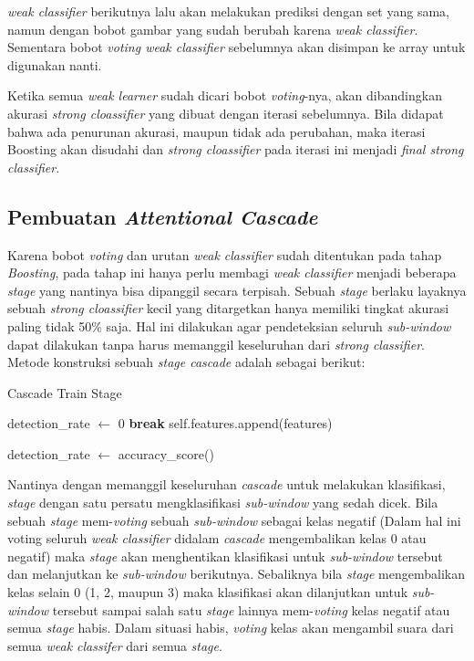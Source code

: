 \textit{weak classifier} berikutnya lalu akan melakukan prediksi dengan set yang sama, 
namun dengan bobot gambar yang sudah berubah karena \textit{weak classifier}. Sementara 
bobot \textit{voting weak classifier} sebelumnya akan disimpan ke array untuk digunakan nanti. 

Ketika semua \textit{weak learner} sudah dicari bobot \textit{voting}-nya, akan dibandingkan 
akurasi \textit{strong cloassifier} yang dibuat dengan iterasi sebelumnya. Bila didapat bahwa 
ada penurunan akurasi, maupun tidak ada perubahan, maka iterasi Boosting akan disudahi dan 
\textit{strong cloassifier} pada iterasi ini menjadi \textit{final strong classifier}.

\subsection{Pembuatan \emph{Attentional Cascade}}

Karena bobot \textit{voting} dan urutan \textit{weak classifier} sudah ditentukan pada 
tahap \textit{Boosting}, pada tahap ini hanya perlu membagi \textit{weak classifier} menjadi 
beberapa \textit{stage} yang nantinya bisa dipanggil secara terpisah. Sebuah \textit{stage} 
berlaku layaknya sebuah \textit{strong cloassifier} kecil yang ditargetkan hanya memiliki 
tingkat akurasi paling tidak 50\% saja. Hal ini dilakukan agar pendeteksian seluruh \textit{sub-window} 
dapat dilakukan tanpa harus memanggil keseluruhan dari \textit{strong classifier}. 
Metode konstruksi sebuah \textit{stage cascade} adalah sebagai berikut:

\begin{algorithm}
  \caption{Cascade Train Stage}
  \begin{algorithmic}[1]
      \State detection\_rate $\gets$ 0
          \State \textbf{break}
        \EndIf
        \State self.features.append(features)

        \State detection\_rate $\gets$ accuracy\_score()
      \EndWhile
    \EndFunction
  \end{algorithmic}
\end{algorithm}

Nantinya dengan memanggil keseluruhan \textit{cascade} untuk melakukan 
klasifikasi, \textit{stage} dengan satu persatu mengklasifikasi 
\textit{sub-window} yang sedah dicek. Bila sebuah \textit{stage} 
mem-\textit{voting} sebuah \textit{sub-window} sebagai kelas negatif 
(Dalam hal ini voting seluruh \textit{weak classifier} didalam \textit{cascade} 
mengembalikan kelas 0 atau negatif) maka \textit{stage} akan menghentikan 
klasifikasi untuk \textit{sub-window} tersebut dan melanjutkan ke 
\textit{sub-window} berikutnya. Sebaliknya bila \textit{stage} mengembalikan 
kelas selain 0 (1, 2, maupun 3) maka klasifikasi akan dilanjutkan 
untuk \textit{sub-window} tersebut sampai salah satu \textit{stage} lainnya 
mem-\textit{voting} kelas negatif atau semua \textit{stage} habis. 
Dalam situasi habis, \textit{voting} kelas akan mengambil suara dari semua 
\textit{weak classifer} dari semua \textit{stage}.



